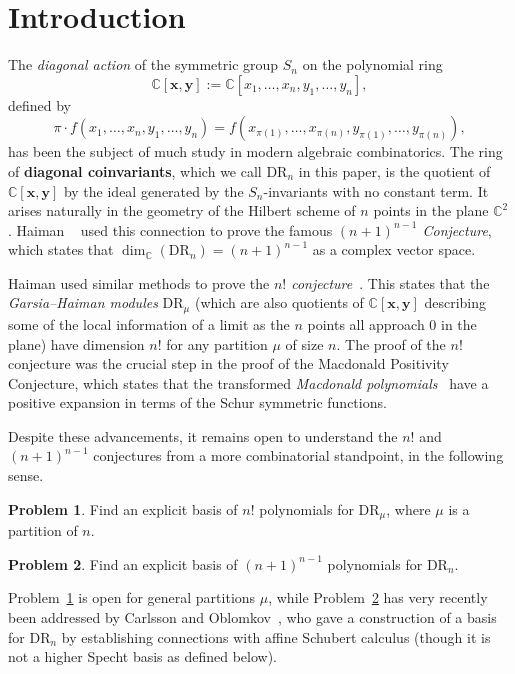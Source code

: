 \documentclass[11pt]{article}
\theoremstyle{definition}
\numberwithin{equation}{section}
\newtheorem{open}{Problem}
\newcommand{\DR}{\mathrm{DR}}
\newcommand{\CC}{\mathbb{C}}
\begin{document}
\section{Introduction}

\noindent The \textit{diagonal action} of the symmetric group $S_n$ on the polynomial ring $$\mathbb{C}[\mathbf{x},\mathbf{y}]:=\mathbb{C}[x_1,\ldots,x_n,y_1,\ldots,y_n],$$ defined by $$\pi\cdot  f(x_1,\ldots,x_n,y_1,\ldots,y_n)=f(x_{\pi(1)},\ldots,x_{\pi(n)},y_{\pi(1)},\ldots,y_{\pi(n)}),$$ has been the subject of much study in modern algebraic combinatorics.  The ring of \textbf{diagonal coinvariants}, which we call $\DR_n$ in this paper, is the quotient of $\mathbb{C}[\mathbf{x},\mathbf{y}]$ by the ideal generated by the $S_n$-invariants with no constant term.  It arises naturally in the geometry of the Hilbert scheme of $n$ points in the plane $\CC^2$.  Haiman ~\cite{HaimanDR} used this connection to prove the famous \textit{$(n+1)^{n-1}$ Conjecture}, which states that $\dim_\CC(\DR_n)=(n+1)^{n-1}$ as a complex vector space.  

Haiman used similar methods to prove the \textit{$n!$ conjecture}~\cite{HaimanGeometry}.  This states that the \textit{Garsia--Haiman modules} $\DR_\mu$ (which are also quotients of $\mathbb{C}[\mathbf{x},\mathbf{y}]$ describing some of the local information of a limit as the $n$ points all approach $0$ in the plane) have dimension $n!$ for any partition $\mu$ of size $n$.  The proof of the $n!$ conjecture was the crucial step in the proof of the Macdonald Positivity Conjecture, which states that the transformed \textit{Macdonald polynomials}~\cite{Macdonald} have a positive expansion in terms of the Schur symmetric functions.

Despite these advancements, it remains open to understand the $n!$ and $(n+1)^{n-1}$ conjectures from a more combinatorial standpoint, in the following sense.

\begin{open}\label{prob:nfact}
	Find an explicit basis of $n!$ polynomials for $\DR_\mu$, where $\mu$ is a partition of $n$.
\end{open}

\begin{open}\label{prob:basis-DR}
	Find an explicit basis of $(n+1)^{n-1}$ polynomials for $\DR_n$.
\end{open}

Problem~\ref{prob:nfact} is open for general partitions $\mu$, while Problem~\ref{prob:basis-DR} has very recently been addressed by Carlsson and Oblomkov~\cite{CarlssonOblomkov}, who gave a construction of a basis for $\mathrm{DR}_n$ by establishing connections with affine Schubert calculus (though it is not a higher Specht basis as defined below). 
\end{document}
